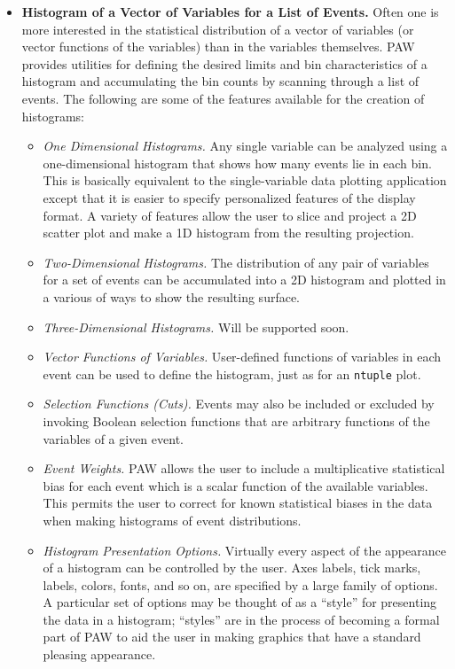 \begin{itemize}
\item {\bf Histogram of a Vector of Variables for a List of Events.}
Often one is more interested in the statistical distribution
of a vector of variables (or vector functions of the variables)
than in the variables themselves.  PAW provides utilities for
defining the desired limits and
bin characteristics of a histogram
and accumulating the bin counts by scanning through a list of
events.  The following are some of the features available
for the creation of histograms:
 
  \begin{itemize}
  \item {\it One Dimensional Histograms.\/}  Any single variable
can be analyzed using a one-dimensional histogram that shows
how many events lie in each bin.  This is basically equivalent to
the single-variable data plotting application except that it
is easier to specify personalized features of the display format.
A variety of features allow the user to slice and project a 2D
scatter plot and make a 1D histogram from the resulting projection.
  \item {\it  Two-Dimensional Histograms.\/} The distribution
of any pair of variables for a set of events can be accumulated
into a 2D histogram and plotted in a various of ways to show
the resulting surface.
  \item {\it Three-Dimensional Histograms.\/}  Will be supported
soon.
\item {\it Vector Functions of Variables.\/} User-defined functions
of variables in each event can be used to define the histogram,
just as for an \verb|ntuple| plot.
\item {\it Selection Functions (Cuts).\/}  Events may also
be included or excluded  by invoking Boolean selection functions
that are arbitrary functions of the variables of a given event.
  \item {\it Event Weights.\/} PAW allows the user to include a
multiplicative statistical bias for each event which is a scalar
function of the available variables.  This permits the user to
correct for known statistical biases in the data when making
histograms of event distributions.
  \item {\it Histogram Presentation Options.\/}  Virtually every
aspect of the appearance of a histogram can be controlled by the
user.  Axes labels, tick marks, labels, colors, fonts, and so
on, are specified by a large family of options.  A particular
set of options may be thought of as a ``style'' for presenting
the data in a histogram; ``styles'' are in the process of
becoming a formal part of PAW to aid the user in making
graphics that have a standard pleasing appearance.
  \end{itemize}
 

\end{itemize}
